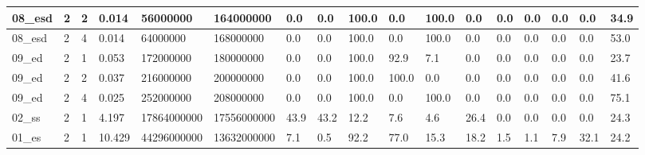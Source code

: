 \documentclass[12pt]{article}
\begin{document}
\begin{flushleft}
\begin{landscape}
\begin{tabular}{| l | l | l | l | l | l | l | l | l | l | l | l | l | l | l | l | l |}
		08\_esd & 2 & 2 & 0.014 & 56000000 & 164000000 & 0.0 & 0.0 & 100.0 & 0.0 & 100.0 & 0.0 & 0.0 & 0.0 & 0.0 & 0.0 & 34.9 \\ \hline
		08\_esd & 2 & 4 & 0.014 & 64000000 & 168000000 & 0.0 & 0.0 & 100.0 & 0.0 & 100.0 & 0.0 & 0.0 & 0.0 & 0.0 & 0.0 & 53.0 \\ \hline
		09\_ed & 2 & 1 & 0.053 & 172000000 & 180000000 & 0.0 & 0.0 & 100.0 & 92.9 & 7.1 & 0.0 & 0.0 & 0.0 & 0.0 & 0.0 & 23.7 \\ \hline
		09\_ed & 2 & 2 & 0.037 & 216000000 & 200000000 & 0.0 & 0.0 & 100.0 & 100.0 & 0.0 & 0.0 & 0.0 & 0.0 & 0.0 & 0.0 & 41.6 \\ \hline
		09\_ed & 2 & 4 & 0.025 & 252000000 & 208000000 & 0.0 & 0.0 & 100.0 & 0.0 & 100.0 & 0.0 & 0.0 & 0.0 & 0.0 & 0.0 & 75.1 \\ \hline
		02\_ss & 2 & 1 & 4.197 & 17864000000 & 17556000000 & 43.9 & 43.2 & 12.2 & 7.6 & 4.6 & 26.4 & 0.0 & 0.0 & 0.0 & 0.0 & 24.3 \\ \hline
		01\_es & 2 & 1 & 10.429 & 44296000000 & 13632000000 & 7.1 & 0.5 & 92.2 & 77.0 & 15.3 & 18.2 & 1.5 & 1.1 & 7.9 & 32.1 & 24.2 \\ \hline
	\end{tabular}
\end{landscape}
	
\end{flushleft}
\end{document}

